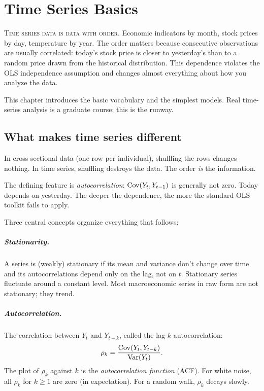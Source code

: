 \chapter{Time Series Basics}
\label{ch:timeseries}

\noindent\textsc{Time series data is data with order.} Economic indicators by month, stock prices by day, temperature by year. The order matters because consecutive observations are usually correlated: today's stock price is closer to yesterday's than to a random price drawn from the historical distribution. This dependence violates the OLS independence assumption and changes almost everything about how you analyze the data.

This chapter introduces the basic vocabulary and the simplest models. Real time-series analysis is a graduate course; this is the runway.

\section{What makes time series different}

In cross-sectional data (one row per individual), shuffling the rows changes nothing. In time series, shuffling destroys the data. The order \emph{is} the information.

The defining feature is \emph{autocorrelation}: $\operatorname{Cov}(Y_t, Y_{t-1})$ is generally not zero. Today depends on yesterday. The deeper the dependence, the more the standard OLS toolkit fails to apply.

Three central concepts organize everything that follows:

\paragraph{Stationarity.} A series is (weakly) stationary if its mean and variance don't change over time and its autocorrelations depend only on the lag, not on $t$. Stationary series fluctuate around a constant level. Most macroeconomic series in raw form are not stationary; they trend.

\paragraph{Autocorrelation.} The correlation between $Y_t$ and $Y_{t-k}$, called the lag-$k$ autocorrelation:
\[
  \rho_k = \frac{\operatorname{Cov}(Y_t, Y_{t-k})}{\operatorname{Var}(Y_t)}.
\]
The plot of $\rho_k$ against $k$ is the \emph{autocorrelation function} (ACF). For white noise, all $\rho_k$ for $k \geq 1$ are zero (in expectation). For a random walk, $\rho_k$ decays slowly.

